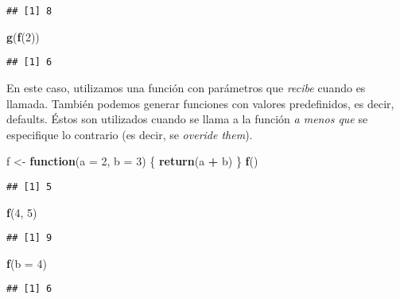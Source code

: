 \documentclass[]{article}
\newenvironment{Shaded}{\begin{snugshade}}{\end{snugshade}}
\newcommand{\KeywordTok}[1]{\textcolor[rgb]{0.13,0.29,0.53}{\textbf{#1}}}
\newcommand{\DataTypeTok}[1]{\textcolor[rgb]{0.13,0.29,0.53}{#1}}
\newcommand{\DecValTok}[1]{\textcolor[rgb]{0.00,0.00,0.81}{#1}}
\newcommand{\StringTok}[1]{\textcolor[rgb]{0.31,0.60,0.02}{#1}}
\newcommand{\ControlFlowTok}[1]{\textcolor[rgb]{0.13,0.29,0.53}{\textbf{#1}}}
\newcommand{\OperatorTok}[1]{\textcolor[rgb]{0.81,0.36,0.00}{\textbf{#1}}}
\newcommand{\NormalTok}[1]{#1}
\begin{document}
\begin{verbatim}
## [1] 8
\end{verbatim}

\begin{Shaded}
\begin{Highlighting}[]
\KeywordTok{g}\NormalTok{(}\KeywordTok{f}\NormalTok{(}\DecValTok{2}\NormalTok{))}
\end{Highlighting}
\end{Shaded}

\begin{verbatim}
## [1] 6
\end{verbatim}

En este caso, utilizamos una función con parámetros que \emph{recibe}
cuando es llamada. También podemos generar funciones con valores
predefinidos, es decir, defaults. Éstos son utilizados cuando se llama a
la función \emph{a menos que} se especifique lo contrario (es decir, se
\emph{overide them}).

\begin{Shaded}
\begin{Highlighting}[]
\NormalTok{f <-}\StringTok{ }\ControlFlowTok{function}\NormalTok{(}\DataTypeTok{a =} \DecValTok{2}\NormalTok{, }\DataTypeTok{b =} \DecValTok{3}\NormalTok{) \{}
  \KeywordTok{return}\NormalTok{(a }\OperatorTok{+}\StringTok{ }\NormalTok{b)}
\NormalTok{\}}
\KeywordTok{f}\NormalTok{()}
\end{Highlighting}
\end{Shaded}

\begin{verbatim}
## [1] 5
\end{verbatim}

\begin{Shaded}
\begin{Highlighting}[]
\KeywordTok{f}\NormalTok{(}\DecValTok{4}\NormalTok{, }\DecValTok{5}\NormalTok{)}
\end{Highlighting}
\end{Shaded}

\begin{verbatim}
## [1] 9
\end{verbatim}

\begin{Shaded}
\begin{Highlighting}[]
\KeywordTok{f}\NormalTok{(}\DataTypeTok{b =} \DecValTok{4}\NormalTok{)}
\end{Highlighting}
\end{Shaded}

\begin{verbatim}
## [1] 6
\end{verbatim}
\end{document}
